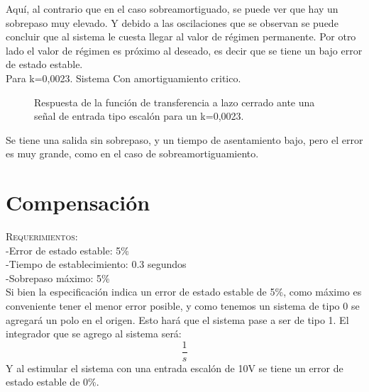 \documentclass[a4paper,11pt]{article}
\begin{document}
Aquí, al contrario que en el caso sobreamortiguado, se puede ver que hay un sobrepaso muy elevado. Y debido a las oscilaciones que se observan se puede concluir que al sistema le cuesta llegar al valor de régimen permanente. Por otro lado el valor de régimen es próximo al deseado, es decir que se tiene un bajo error de estado estable.\\
Para k=0,0023. Sistema Con amortiguamiento critico.\\

  \begin{figure}[H] %
	\caption{Respuesta de la función de transferencia a lazo cerrado ante una señal de entrada tipo escalón para un k=0,0023.}
	\label{fig:FTlazoc_kcritico}
	\end{figure} 
	
Se tiene una salida sin sobrepaso, y un tiempo de asentamiento bajo, pero el error es muy grande, como en el caso de sobreamortiguamiento.
	
\section{Compensación}

\textsc{Requerimientos:}\\
-Error de estado estable: 5\%\\
-Tiempo de establecimiento: 0.3 segundos\\
-Sobrepaso máximo: 5\%\\

Si bien la especificación indica un error de estado estable de 5\%, como máximo es conveniente tener el menor error posible, y como tenemos un sistema de tipo 0 se agregará un polo en el origen. Esto hará que el sistema pase a ser de tipo 1.
El integrador que se agrego al sistema será:$$\frac{1}{s}$$
Y al estimular el sistema con una entrada escalón de 10V se tiene un error de estado estable de 0\%.\\
	
\end{document}
